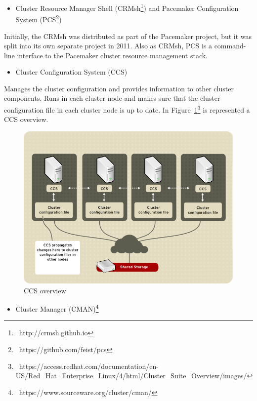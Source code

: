\documentclass[a4paper, 12pt]{book}
\begin{document}
\begin{itemize}
	\item Cluster Resource Manager Shell (CRMsh\footnote{{\tiny\ http://crmsh.github.io}}) and Pacemaker Configuration System (PCS\footnote{{\tiny\ https://github.com/feist/pcs}})
\end{itemize}

\noindent Initially, the CRMsh was distributed as part of the Pacemaker project, but it was split into its own separate project in 2011. Also as CRMsh, PCS is a command-line interface to the Pacemaker cluster resource management stack.

\begin{itemize}
	\item Cluster Configuration System (CCS)
\end{itemize}

\noindent Manages the cluster configuration and provides information to other cluster components. Runs in each cluster node and makes sure that the cluster configuration file in each cluster node is up to date. In Figure~\ref{fig:ccs}\footnote{\tiny\ {https://access.redhat.com/documentation/en-US/Red\_Hat\_Enterprise\_Linux/4/html/Cluster\_Suite\_Overview/images/}} is represented a CCS overview.

\begin{figure}[H]
  \centering
  \includegraphics[scale=0.55]{ccs-overview.png}
  \caption[CCS overview]{CCS overview}
  \label{fig:ccs}
\end{figure}

\begin{itemize}
	\item Cluster Manager (CMAN)\footnote{{\tiny\ https://www.sourceware.org/cluster/cman/}}
\end{itemize}
\end{document}
